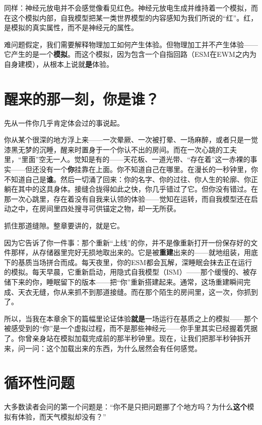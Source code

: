 \documentclass[11pt, twoside, openright]{book}
\begin{document}
同样：神经元放电并不会感觉像看见红色。神经元放电生成并维持着一个模拟，而在这个模拟内部，自我模型把某一类世界模型的内容感知为我们所说的“红”。红，是模拟的真实属性，而不是神经元的属性。

难问题假定，我们需要解释物理加工如何产生体验。但物理加工并不产生体验------它产生的是一个\textbf{模拟}。而这个模拟，因为包含一个自指回路（ESM在EWM之内为自身建模），从根本上说就\textbf{是}体验。

\section*{醒来的那一刻，你是谁？}

先从一件你几乎肯定体会过的事说起。

你从某个很深的地方浮上来------一次晕厥、一次被打晕、一场麻醉，或者只是一觉漆黑无梦的沉睡，醒来时置身于一个你认不出的房间。而在一次心跳的工夫里，“里面”空无一人。觉知是有的------天花板、一道光带、“存在着”这一赤裸的事实------但还没有一个\textbf{你}挂靠在上面。你不知道自己在哪里。在漫长的一秒钟里，你不知道自己是\textbf{谁}。然后一切涌了回来：你的名字、你的过往、你人生的轮廓、你正躺在其中的这具身体。接缝合拢得如此之快，你几乎错过了它。但你没有错过。在那一次心跳里，存在着没有自我来认领的体验------觉知在运转，而自我模型还在启动之中，在房间里四处搜寻可供锚定之物，却一无所获。

抓住那道缝隙。整章要讲的，就是它。

因为它告诉了你一件事：那个重新“上线”的你，并不是像重新打开一份保存好的文件那样，从存储器里完好无损地取出来的。它是被\textbf{重建}出来的------就地组装，用底下的基质当场拼合而成。每天夜里，你的ESM都会瓦解，深睡眠会抹去正在运行的模拟。每天早晨，它重新启动，用隐式自我模型（ISM）------那个缓慢的、被存储下来的你，睡眠留下的版本------把“你”重新搭建起来。通常，这场重建瞬间完成、天衣无缝，你从来抓不到那道接缝。而在那个陌生的房间里，这一次，你抓到了。

所以，当我在本章余下的篇幅里论证体验\textbf{就是}一场运行在基质之上的模拟------那个被感受到的“你”是一个虚拟过程，而不是那些神经元------你手里其实已经握着凭据了。你曾亲身站在模拟加载完成前的那半秒钟里。现在，让我们把那半秒钟拆开来，问一问：这个加载出来的东西，为什么居然会有任何感觉。

\section*{循环性问题}

大多数读者会问的第一个问题是：“你不是只把问题挪了个地方吗？为什么\textbf{这个}模拟有体验，而天气模拟却没有？”
\end{document}
